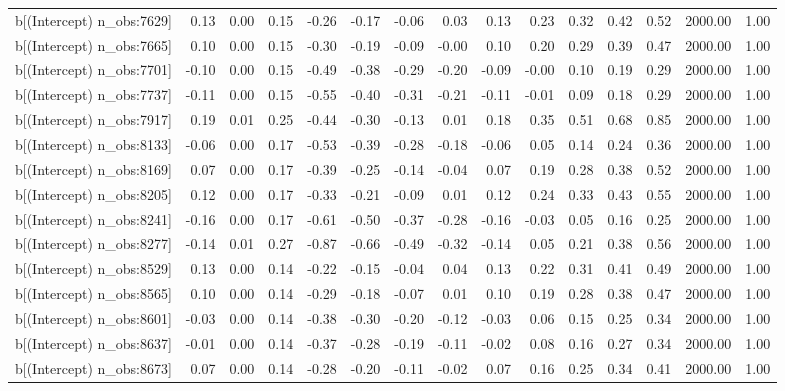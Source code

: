 \begin{table}[ht]
\begin{tabular}{rrrrrrrrrrrrrrr}
  b[(Intercept) n\_obs:7629] & 0.13 & 0.00 & 0.15 & -0.26 & -0.17 & -0.06 & 0.03 & 0.13 & 0.23 & 0.32 & 0.42 & 0.52 & 2000.00 & 1.00 \\ 
  b[(Intercept) n\_obs:7665] & 0.10 & 0.00 & 0.15 & -0.30 & -0.19 & -0.09 & -0.00 & 0.10 & 0.20 & 0.29 & 0.39 & 0.47 & 2000.00 & 1.00 \\ 
  b[(Intercept) n\_obs:7701] & -0.10 & 0.00 & 0.15 & -0.49 & -0.38 & -0.29 & -0.20 & -0.09 & -0.00 & 0.10 & 0.19 & 0.29 & 2000.00 & 1.00 \\ 
  b[(Intercept) n\_obs:7737] & -0.11 & 0.00 & 0.15 & -0.55 & -0.40 & -0.31 & -0.21 & -0.11 & -0.01 & 0.09 & 0.18 & 0.29 & 2000.00 & 1.00 \\ 
  b[(Intercept) n\_obs:7917] & 0.19 & 0.01 & 0.25 & -0.44 & -0.30 & -0.13 & 0.01 & 0.18 & 0.35 & 0.51 & 0.68 & 0.85 & 2000.00 & 1.00 \\ 
  b[(Intercept) n\_obs:8133] & -0.06 & 0.00 & 0.17 & -0.53 & -0.39 & -0.28 & -0.18 & -0.06 & 0.05 & 0.14 & 0.24 & 0.36 & 2000.00 & 1.00 \\ 
  b[(Intercept) n\_obs:8169] & 0.07 & 0.00 & 0.17 & -0.39 & -0.25 & -0.14 & -0.04 & 0.07 & 0.19 & 0.28 & 0.38 & 0.52 & 2000.00 & 1.00 \\ 
  b[(Intercept) n\_obs:8205] & 0.12 & 0.00 & 0.17 & -0.33 & -0.21 & -0.09 & 0.01 & 0.12 & 0.24 & 0.33 & 0.43 & 0.55 & 2000.00 & 1.00 \\ 
  b[(Intercept) n\_obs:8241] & -0.16 & 0.00 & 0.17 & -0.61 & -0.50 & -0.37 & -0.28 & -0.16 & -0.03 & 0.05 & 0.16 & 0.25 & 2000.00 & 1.00 \\ 
  b[(Intercept) n\_obs:8277] & -0.14 & 0.01 & 0.27 & -0.87 & -0.66 & -0.49 & -0.32 & -0.14 & 0.05 & 0.21 & 0.38 & 0.56 & 2000.00 & 1.00 \\ 
  b[(Intercept) n\_obs:8529] & 0.13 & 0.00 & 0.14 & -0.22 & -0.15 & -0.04 & 0.04 & 0.13 & 0.22 & 0.31 & 0.41 & 0.49 & 2000.00 & 1.00 \\ 
  b[(Intercept) n\_obs:8565] & 0.10 & 0.00 & 0.14 & -0.29 & -0.18 & -0.07 & 0.01 & 0.10 & 0.19 & 0.28 & 0.38 & 0.47 & 2000.00 & 1.00 \\ 
  b[(Intercept) n\_obs:8601] & -0.03 & 0.00 & 0.14 & -0.38 & -0.30 & -0.20 & -0.12 & -0.03 & 0.06 & 0.15 & 0.25 & 0.34 & 2000.00 & 1.00 \\ 
  b[(Intercept) n\_obs:8637] & -0.01 & 0.00 & 0.14 & -0.37 & -0.28 & -0.19 & -0.11 & -0.02 & 0.08 & 0.16 & 0.27 & 0.34 & 2000.00 & 1.00 \\ 
  b[(Intercept) n\_obs:8673] & 0.07 & 0.00 & 0.14 & -0.28 & -0.20 & -0.11 & -0.02 & 0.07 & 0.16 & 0.25 & 0.34 & 0.41 & 2000.00 & 1.00 \\ 

\end{tabular}
\end{table}
